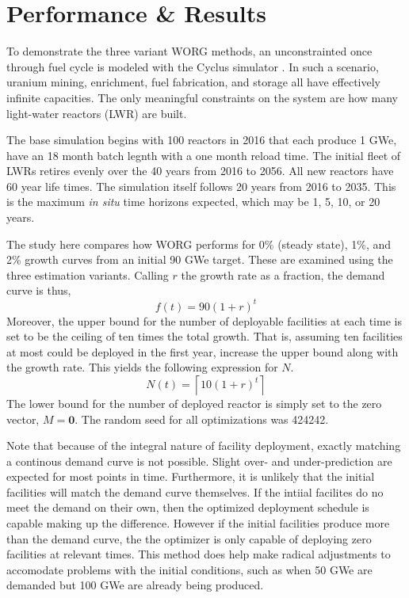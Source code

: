 \section{Performance \& Results}
\label{results}

To demonstrate the three variant WORG methods, an unconstrainted once 
through fuel cycle is modeled with the Cyclus simulator 
\cite{DBLP:journals/corr/HuffGCFMOSSW15}. In such a scenario, uranium
mining, enrichment, fuel fabrication, and storage all have effectively 
infinite capacities. The only meaningful constraints on the system are
how many light-water reactors (LWR) are built.

The base simulation begins with 100 reactors in 2016 that each produce
1 GWe, have an 18 month batch legnth with a one month reload time.
The initial fleet of LWRs retires evenly over the 40 years from 2016 to 
2056. All new reactors have 60 year life times.  The simulation itself 
follows 20 years from 2016 to 2035. This is the maximum \emph{in situ} time 
horizons expected, which may be 1, 5, 10, or 20 years.

The study here compares how WORG performs for 0\% (steady state), 1\%, 
and 2\% growth curves from an initial 90 GWe target. These are examined
using the three estimation variants.  Calling $r$ the growth rate as a 
fraction, the demand curve is thus,
\begin{equation}
\label{f-rate}
f(t) = 90 (1 + r)^t
\end{equation}
Moreover, the upper bound for the number of deployable facilities at 
each time is set to be the ceiling of ten times the total growth. 
That is, assuming ten facilities at most could be deployed in the first
year, increase the upper bound along with the growth rate.  This yields
the following expression for $N$.
\begin{equation}
\label{n-rate}
N(t) = \left\lceil 10 (1 + r)^t\right\rceil
\end{equation}
The lower bound for the number of deployed reactor is simply set to the 
zero vector, $M = \mathbf{0}$.  The random seed for all optimizations 
was 424242.

Note that because of the integral nature of facility deployment, 
exactly matching a continous demand curve is not possible. Slight over- 
and under-prediction are expected for most points in time. Furthermore, 
it is unlikely that the initial facilities will match the demand curve 
themselves. If the intiial facilites do no meet the demand on their own, 
then the optimized deployment schedule is capable making up the difference.
However if the initial facilities produce more than the demand curve, 
the the optimizer is only capable of deploying zero facilities at relevant
times. This method does help make radical adjustments to accomodate 
problems with the initial conditions, such as when 50 GWe are demanded 
but 100 GWe are already being produced.

